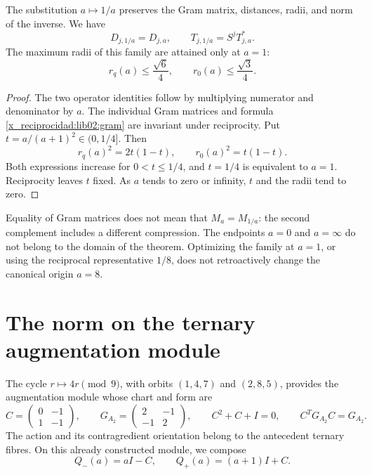 \begin{proposition}
\label{x_reciprocidad:lib02:dualidad-a}
The substitution \(a\mapsto1/a\) preserves the Gram matrix, distances, radii, and norm of the inverse. We have
\[
 D_{j,1/a}=D_{j,a},\qquad
 T_{j,1/a}=S^jT_{j,a}^*.
\]
The maximum radii of this family are attained only at \(a=1\):
\[
 r_q(a)\leq\frac{\sqrt6}{4},\qquad
 r_0(a)\leq\frac{\sqrt3}{4}.
\]
\end{proposition}
\begin{proof}
The two operator identities follow by multiplying numerator and denominator by \(a\). The individual Gram matrices and formula \eqref{x_reciprocidad:lib02:gram} are invariant under reciprocity. Put \(t=a/(a+1)^2\in(0,1/4]\). Then
\[
 r_q(a)^2=2t(1-t),\qquad r_0(a)^2=t(1-t).
\]
Both expressions increase for \(0<t\leq1/4\), and \(t=1/4\) is equivalent to \(a=1\). Reciprocity leaves \(t\) fixed. As \(a\) tends to zero or infinity, \(t\) and the radii tend to zero.
\end{proof}

Equality of Gram matrices does not mean that \(M_a=M_{1/a}\): the second
complement includes a different compression. The endpoints \(a=0\)
and \(a=\infty\) do not belong to the domain of the theorem. Optimizing the
family at \(a=1\), or using the reciprocal representative \(1/8\),
does not retroactively change the canonical origin \(a=8\).

\section{The norm on the ternary augmentation module}
\label{x_reciprocidad:lib02:modulo-ternario}

The cycle \(r\mapsto4r\pmod9\), with orbits \((1,4,7)\) and
\((2,8,5)\), provides the augmentation module whose chart and form are
\[
 C=\begin{pmatrix}0&-1\\1&-1\end{pmatrix},\qquad
 G_{A_2}=\begin{pmatrix}2&-1\\-1&2\end{pmatrix},\qquad
 C^2+C+I=0,\qquad C^TG_{A_2}C=G_{A_2}.
\]
The action and its contragredient orientation belong to the antecedent ternary fibres. On this already constructed module, we compose
\[
 Q_-(a)=aI-C,\qquad Q_+(a)=(a+1)I+C.
\]

